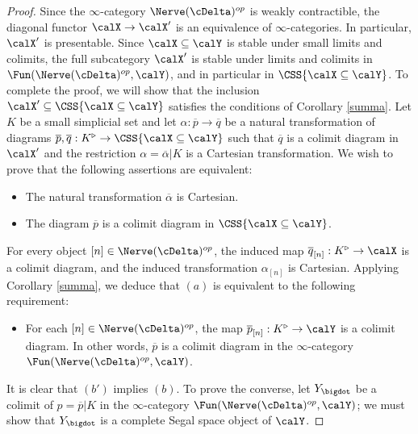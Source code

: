 \begin{proof}
Since the $\infty$-category $\Nerve(\cDelta)^{op}$ is weakly contractible, the diagonal functor
$\calX \rightarrow \calX'$ is an equivalence of $\infty$-categories. In particular, $\calX'$ is presentable.
Since $\calX \subseteq \calY$ is stable under small limits and colimits, the full subcategory
$\calX'$ is stable under limits and colimits in $\Fun( \Nerve(\cDelta)^{op}, \calY)$, and in particular
in $\CSS{ \calX \subseteq \calY}$. To complete the proof, we will show that 
the inclusion $\calX' \subseteq \CSS{ \calX \subseteq \calY}$ satisfies the conditions of Corollary \ref{summa}. Let $K$ be a small simplicial set and let $\alpha: \overline{p} \rightarrow \overline{q}$
be a natural transformation of diagrams $\overline{p}, \overline{q}: K^{\triangleright} \rightarrow
\CSS{ \calX \subseteq \calY }$ such that $\overline{q}$ is a colimit diagram in $\calX'$ and
the restriction $\alpha = \overline{\alpha} | K$ is a Cartesian transformation. We wish to prove that the following assertions are equivalent:
\begin{itemize}
\item[$(a)$] The natural transformation $\overline{\alpha}$ is Cartesian.
\item[$(b)$] The diagram $\overline{p}$ is a colimit diagram in $\CSS{ \calX \subseteq \calY}$.
\end{itemize}
For every object $[n] \in \Nerve(\cDelta)^{op}$, the induced map $\overline{q}_{[n]}: K^{\triangleright}
\rightarrow \calX$ is a colimit diagram, and the induced transformation $\alpha_{[n]}$ is Cartesian.
Applying Corollary \ref{summa}, we deduce that $(a)$ is equivalent to the following requirement:
\begin{itemize}
\item[$(b')$] For each $[n] \in \Nerve(\cDelta)^{op}$, the map $\overline{p}_{[n]}: K^{\triangleright} \rightarrow \calY$ is a colimit diagram. In other words, $\overline{p}$ is a colimit diagram
in the $\infty$-category $\Fun( \Nerve(\cDelta)^{op}, \calY)$. 
\end{itemize}

It is clear that $(b')$ implies $(b)$. To prove the converse, let $Y_{\bigdot}$ be a colimit of
$p = \overline{p} | K$ in the $\infty$-category $\Fun( \Nerve(\cDelta)^{op}, \calY)$; we must show that
$Y_{\bigdot}$ is a complete Segal space object of $\calY$.


\end{proof}
